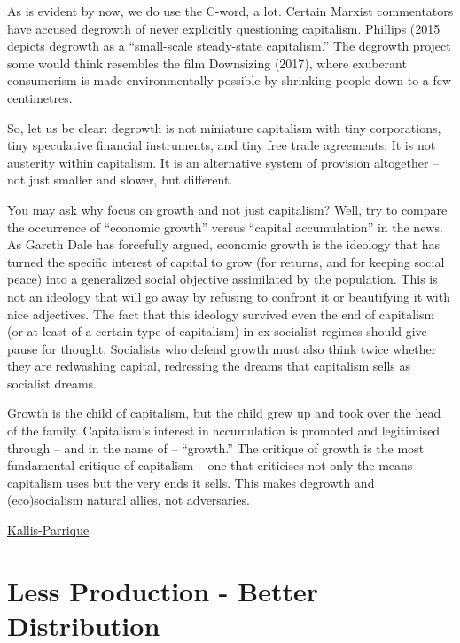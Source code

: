 \documentclass[
]{book}
\begin{document}
As is evident by now, we do use the C-word, a lot. Certain Marxist commentators have accused degrowth of never explicitly questioning capitalism. Phillips (2015 depicts degrowth as a ``small-scale steady-state capitalism.'' The degrowth project some would think resembles the film Downsizing (2017), where exuberant consumerism is made environmentally possible by shrinking people down to a few centimetres.

So, let us be clear: degrowth is not miniature capitalism with tiny corporations, tiny speculative financial instruments, and tiny free trade agreements. It is not austerity within capitalism. It is an alternative system of provision altogether -- not just smaller and slower, but different.

You may ask why focus on growth and not just capitalism? Well, try to compare the occurrence of ``economic growth'' versus ``capital accumulation'' in the news. As Gareth Dale has forcefully argued, economic growth is the ideology that has turned the specific interest of capital to grow (for returns, and for keeping social peace) into a generalized social objective assimilated by the population. This is not an ideology that will go away by refusing to confront it or beautifying it with nice adjectives. The fact that this ideology survived even the end of capitalism (or at least of a certain type of capitalism) in ex-socialist regimes should give pause for thought. Socialists who defend growth must also think twice whether they are redwashing capital, redressing the dreams that capitalism sells as socialist dreams.

Growth is the child of capitalism, but the child grew up and took over the head of the family. Capitalism's interest in accumulation is promoted and legitimised through -- and in the name of -- ``growth.'' The critique of growth is the most fundamental critique of capitalism -- one that criticises not only the means capitalism uses but the very ends it sells. This makes degrowth and (eco)socialism natural allies, not adversaries.

\href{https://braveneweurope.com/timothee-parrique-giorgos-kallis-degrowth-socialism-without-growth}{Kallis-Parrique}

\hypertarget{less-production---better-distribution}{%
\section{Less Production - Better Distribution}\label{less-production---better-distribution}}
\end{document}
